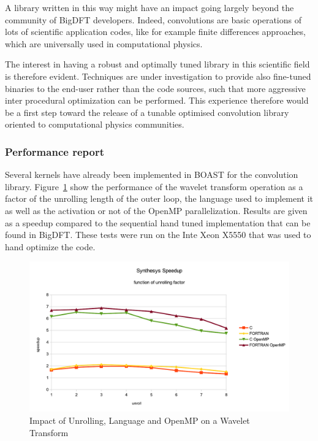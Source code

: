 \documentclass[11pt, a4paper, twoside]{montblanc}
\begin{document}
A library written in this way might have an impact going largely beyond the
community of BigDFT developers.  Indeed, convolutions are basic operations of
lots of scientific application codes, like for example finite differences
approaches, which are universally used in computational physics.

The interest in having a robust and optimally tuned library in this scientific
field is therefore evident.  Techniques are under investigation to provide also
fine-tuned binaries to the end-user rather than the code sources, such that
more aggressive inter procedural optimization can be performed.  This experience
therefore would be a first step toward the release of a tunable optimised
convolution library oriented to computational physics communities.


    \subsubsection{Performance report}

Several kernels have already been implemented in BOAST for the convolution
library. Figure~\ref{fig:synthesis} show the performance of the wavelet
transform operation as a factor of the unrolling length of the outer loop, the
language used to implement it as well as the activation or not of the OpenMP
parallelization. Results are given as a speedup compared to the sequential hand
tuned implementation that can be found in BigDFT. These tests were run on the
Inte Xeon X5550 that was used to hand optimize the code.

\begin{figure}
\begin{center}
\includegraphics[scale=0.7]{Res_synthesis}
\end{center}
\caption{Impact of Unrolling, Language and OpenMP on a Wavelet Transform}
\label{fig:synthesis}
\end{figure}
\end{document}
